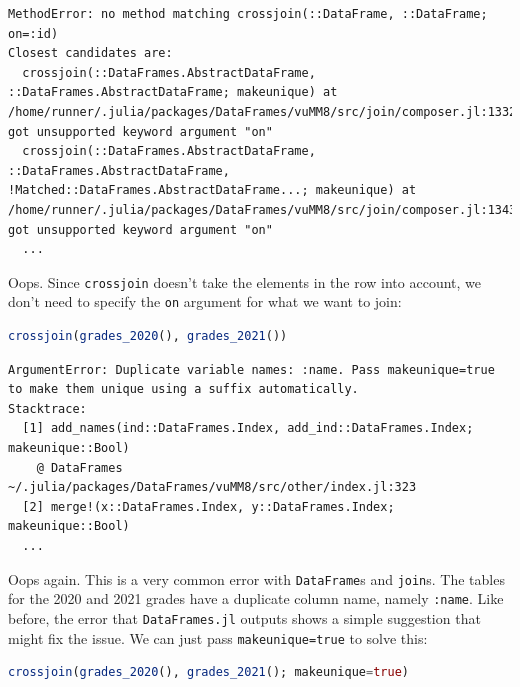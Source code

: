 \documentclass[
  notoc %
]{tufte-book}
\newcommand{\passthrough}[1]{#1}
\begin{document}
\begin{lstlisting}[language=Output]
MethodError: no method matching crossjoin(::DataFrame, ::DataFrame; on=:id)
Closest candidates are:
  crossjoin(::DataFrames.AbstractDataFrame, ::DataFrames.AbstractDataFrame; makeunique) at /home/runner/.julia/packages/DataFrames/vuMM8/src/join/composer.jl:1332 got unsupported keyword argument "on"
  crossjoin(::DataFrames.AbstractDataFrame, ::DataFrames.AbstractDataFrame, !Matched::DataFrames.AbstractDataFrame...; makeunique) at /home/runner/.julia/packages/DataFrames/vuMM8/src/join/composer.jl:1343 got unsupported keyword argument "on"
  ...
\end{lstlisting}

Oops. Since \passthrough{\lstinline!crossjoin!} doesn't take the
elements in the row into account, we don't need to specify the
\passthrough{\lstinline!on!} argument for what we want to join:

\begin{lstlisting}[language=Julia]
crossjoin(grades_2020(), grades_2021())
\end{lstlisting}

\begin{lstlisting}[language=Output]
ArgumentError: Duplicate variable names: :name. Pass makeunique=true to make them unique using a suffix automatically.
Stacktrace:
  [1] add_names(ind::DataFrames.Index, add_ind::DataFrames.Index; makeunique::Bool)
    @ DataFrames ~/.julia/packages/DataFrames/vuMM8/src/other/index.jl:323
  [2] merge!(x::DataFrames.Index, y::DataFrames.Index; makeunique::Bool)
  ...
\end{lstlisting}

Oops again. This is a very common error with
\passthrough{\lstinline!DataFrame!}s and
\passthrough{\lstinline!join!}s. The tables for the 2020 and 2021 grades
have a duplicate column name, namely \passthrough{\lstinline!:name!}.
Like before, the error that \passthrough{\lstinline!DataFrames.jl!}
outputs shows a simple suggestion that might fix the issue. We can just
pass \passthrough{\lstinline!makeunique=true!} to solve this:

\begin{lstlisting}[language=Julia]
crossjoin(grades_2020(), grades_2021(); makeunique=true)
\end{lstlisting}
\end{document}
